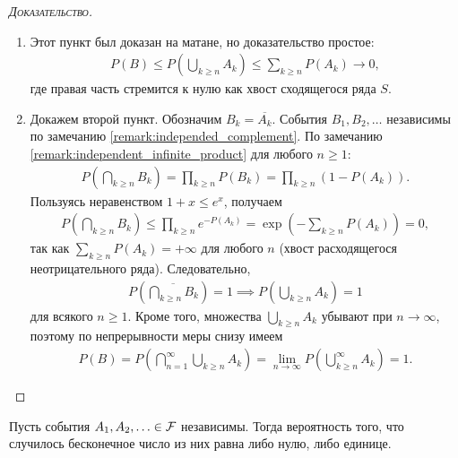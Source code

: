 \documentclass[../main.tex]{subfiles}
\begin{document}
\begin{proof}[\normalfont\textsc{Доказательство}]\
 \begin{enumerate}
  \item Этот пункт был доказан на матане, но доказательство простое:
   \begin{align*}
    P(B) \leqslant P \left( \bigcup_{k \geqslant n} A_k \right) \leqslant \sum_{k \geqslant n} P(A_k) \to 0,
   \end{align*} где правая часть стремится к нулю как хвост сходящегося ряда $ S $.

  \item Докажем второй пункт. Обозначим $B_k = \overline {A_k}$. События $B_1, B_2, \ldots$ независимы по замечанию \ref{remark:independed_complement}. По замечанию \ref{remark:independent_infinite_product} для любого $ n \geqslant 1$:
   \begin{align*}
    P \left( \bigcap_{k \geqslant n} B_k \right) = \prod_{k \geqslant n} P(B_k) = \prod_{k \geqslant n} (1 - P(A_k)).
   \end{align*} Пользуясь неравенством $ 1 + x \leqslant e^{x} $, получаем 
   \begin{align*}
    P \left( \bigcap_{k \geqslant n} B_k \right) \leqslant \prod_{k \geqslant n} e^{-P(A_k)} = \exp \left(-\sum_{k \geqslant n} P(A_k)\right) = 0,
   \end{align*} так как $ \sum_{k \geqslant n} P(A_k) = +\infty $ для любого $ n $ (хвост расходящегося неотрицательного ряда). Следовательно,
   \begin{align*}
    P \left( \overline { \bigcap_{k \geqslant n} B_k } \right) = 1 \implies P \left( \bigcup_{k \geqslant n} A_k \right) = 1
   \end{align*} для всякого $ n \geqslant 1 $. Кроме того, множества $\bigcup_{k \geqslant n} A_k$ убывают при $ n \to \infty $, поэтому по непрерывности меры снизу имеем
   \begin{align*}
    P(B) = P \left( \bigcap_{n=1}^{\infty} \bigcup_{k \geqslant n} A_k \right) = \lim_{n \to \infty} P \left( \bigcup_{k \geqslant n}^{\infty} A_k \right) = 1.
   \end{align*}
 \end{enumerate}
\end{proof}
\begin{crly*}
 Пусть события $A_1, A_2, \ldots \in \mathcal F$ независимы. Тогда вероятность того, что случилось бесконечное число из них равна либо нулю, либо единице. 
\end{crly*}
\end{document}
